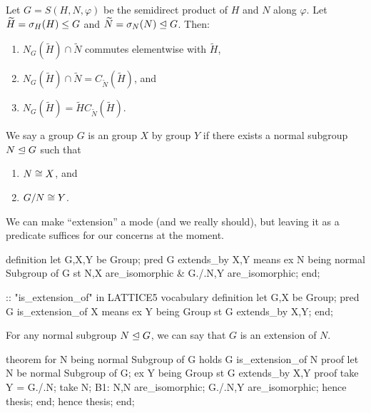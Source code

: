 \begin{theorem}
Let $G=S(H,N,\varphi)$ be the semidirect product of $H$ and $N$ along $\varphi$.
Let $\widetilde{H}=\sigma_{H}(H)\leq G$ and
$\widetilde{N}=\sigma_{N}(N)\trianglelefteq G$.
Then:
\begin{enumerate}
\item $N_{G}(\widetilde{H})\cap\widetilde{N}$ commutes elementwise with $\widetilde{H}$,
\item $N_{G}(\widetilde{H})\cap\widetilde{N} = C_{\widetilde{N}}(\widetilde{H})$,
and
\item $N_{G}(\widetilde{H}) = \widetilde{H}C_{\widetilde{N}}(\widetilde{H})$.
\end{enumerate}
\end{theorem}

\begin{definition}
We say a group $G$ is an  group $X$ by group $Y$ if
there exists a normal subgroup $N\trianglelefteq G$ such that
\begin{enumerate}
\item $N\cong X$, and
\item $G/N\cong Y$.
\end{enumerate}
\end{definition}

\begin{def-remark}
We can make ``extension'' a mode (and we really should), but leaving it
as a predicate suffices for our concerns at the moment.
\end{def-remark}

\begin{mizar}
definition
  let G,X,Y be Group;
  pred G extends_by X,Y means
  ex N being normal Subgroup of G
  st N,X are_isomorphic & G./.N,Y are_isomorphic;
end;

:: "is_extension_of" in LATTICE5 vocabulary
definition
  let G,X be Group;
  pred G is_extension_of X means
  ex Y being Group st G extends_by X,Y;
end;
\end{mizar}

\begin{theorem}
For any normal subgroup $N\trianglelefteq G$, we can say that $G$ is an
extension of $N$.
\end{theorem}

\begin{mizar}
theorem
  for N being normal Subgroup of G
  holds G is_extension_of N
proof
  let N be normal Subgroup of G;
  ex Y being Group st G extends_by X,Y
  proof
    take Y = G./.N;
    take N;
    B1: N,N are_isomorphic;
    G./.N,Y are_isomorphic;
    hence thesis;
  end;
  hence thesis;
end;
\end{mizar}

